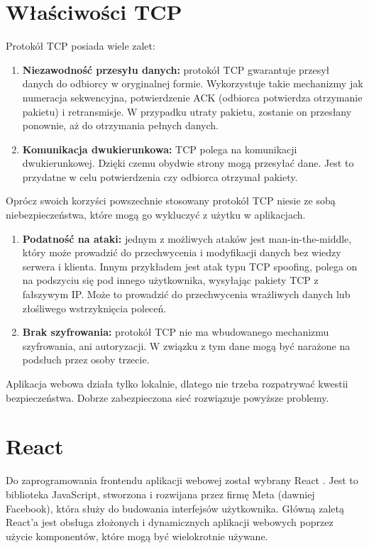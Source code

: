 \section{Właściwości TCP}
Protokół TCP posiada wiele zalet:
\begin{enumerate}
    \item \textbf{Niezawodność przesyłu danych:} protokół TCP gwarantuje przesył danych do odbiorcy w oryginalnej formie. Wykorzystuje takie mechanizmy jak numeracja sekwencyjna, potwierdzenie ACK (odbiorca potwierdza otrzymanie pakietu) i retransmisje. W przypadku utraty pakietu, zostanie on przesłany ponownie, aż do otrzymania pełnych danych.
    \item \textbf{Komunikacja dwukierunkowa:} TCP polega na komunikacji dwukierunkowej. Dzięki czemu obydwie strony mogą przesyłać dane. Jest to przydatne w celu potwierdzenia czy odbiorca otrzymał pakiety.
\end{enumerate}
Oprócz swoich korzyści powszechnie stosowany protokół TCP niesie ze sobą niebezpieczeństwa, które mogą go wykluczyć z użytku w aplikacjach.
\begin{enumerate}
    \item \textbf{Podatność na ataki:} jednym z możliwych ataków jest man-in-the-middle, który może prowadzić do przechwycenia i modyfikacji danych bez wiedzy serwera i klienta. Innym przykładem jest atak typu TCP spoofing, polega on na podszyciu się pod innego użytkownika, wysyłając pakiety TCP z fałszywym IP. Może to prowadzić do przechwycenia wrażliwych danych lub złośliwego wstrzyknięcia poleceń.
    \item \textbf{Brak szyfrowania:} protokół TCP nie ma wbudowanego mechanizmu szyfrowania, ani autoryzacji. W związku z tym dane mogą być narażone na podsłuch przez osoby trzecie.
\end{enumerate}
Aplikacja webowa działa tylko lokalnie, dlatego nie trzeba rozpatrywać kwestii bezpieczeństwa. Dobrze zabezpieczona sieć rozwiązuje powyższe problemy.
\section{React}
\label{section:React}
Do zaprogramowania frontendu aplikacji webowej został wybrany React \cite{React}. Jest to biblioteka JavaScript, stworzona i rozwijana przez firmę Meta (dawniej Facebook), która służy do budowania interfejsów użytkownika. Główną zaletą React'a jest obsługa złożonych i dynamicznych aplikacji webowych poprzez użycie komponentów, które mogą być wielokrotnie używane.

